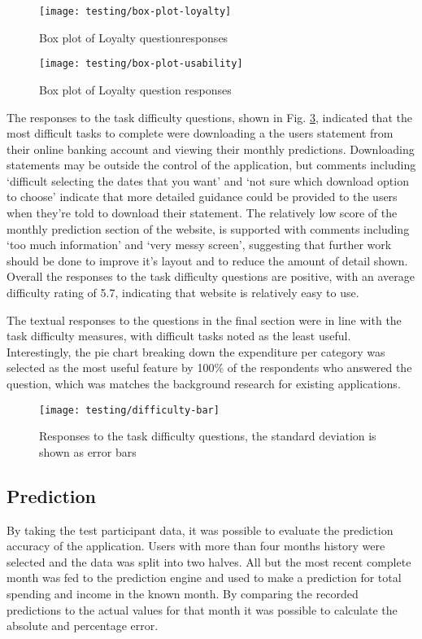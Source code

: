 \begin{figure}
\centering
\texttt{[image: testing/box-plot-loyalty]}
\caption{Box plot of Loyalty questionresponses\protect\footnotemark}
\label{fig:box-loyalty}
\end{figure}


\begin{figure}
\centering
\texttt{[image: testing/box-plot-usability]}
\caption{Box plot of Loyalty question responses}
\label{fig:box-usablity}
\end{figure}

The responses to the task difficulty questions, shown in Fig. \ref{fig:box-difficulty}, indicated that the most difficult tasks to complete were downloading a the users statement from their online banking account and viewing their monthly predictions.
%
Downloading statements may be outside the control of the application, but comments including `difficult selecting the dates that you want' and `not sure which download option to choose' indicate that more detailed guidance could be provided to the users when they're told to download their statement.
%
The relatively low score of the monthly prediction section of the website, is supported with comments including `too much information' and `very messy screen', suggesting that further work should be done to improve it's layout and to reduce the amount of detail shown.
%
Overall the responses to the task difficulty questions are positive, with an average difficulty rating of 5.7, indicating that website is relatively easy to use.

The textual responses to the questions in the final section were in line with the task difficulty measures, with difficult tasks noted as the least useful. Interestingly, the pie chart breaking down the expenditure per category was selected as the most useful feature by 100\% of the respondents who answered the question, which was matches the background research for existing applications.

\begin{figure}
\centering
\texttt{[image: testing/difficulty-bar]}
\caption{Responses to the task difficulty questions, the standard deviation is shown as error bars}
\label{fig:box-difficulty}
\end{figure}

\subsection{Prediction}
By taking the test participant data, it was possible to evaluate the prediction accuracy of the application. Users with more than four months history were selected and the data was split into two halves. All but the most recent complete month was fed to the prediction engine and used to make a prediction for total spending and income in the known month. By comparing the recorded predictions to the actual values for that month it was possible to calculate the absolute and percentage error.

